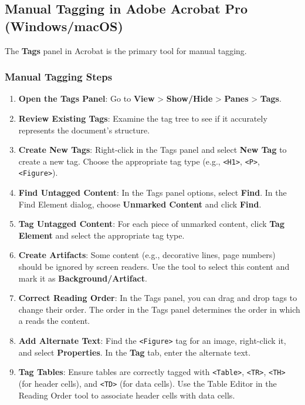 \subsection{Manual Tagging in Adobe Acrobat Pro (Windows/macOS)}
\label{subsec:manual-tagging-acrobat}
The \textbf{Tags} panel in Acrobat is the primary tool for manual tagging.

\subsubsection{Manual Tagging Steps}
\label{ssubsec:manual-tagging-steps}
\begin{enumerate}
	\item \textbf{Open the Tags Panel}: Go to \textbf{View} > \textbf{Show/Hide} > \textbf{ Panes} > \textbf{Tags}.
	\item \textbf{Review Existing Tags}: Examine the tag tree to see if it accurately represents the document's structure.
	\item \textbf{Create New Tags}: Right-click in the Tags panel and select \textbf{New Tag} to create a new tag. Choose the appropriate tag type (e.g., \texttt{<H1>}, \texttt{<P>}, \texttt{<Figure>}).
	\item \textbf{Find Untagged Content}: In the Tags panel options, select \textbf{Find}. In the Find Element dialog, choose \textbf{Unmarked Content} and click \textbf{Find}.
	\item \textbf{Tag Untagged Content}: For each piece of unmarked content, click \textbf{Tag Element} and select the appropriate tag type.
	\item \textbf{Create Artifacts}: Some content (e.g., decorative lines, page numbers) should be ignored by screen readers. Use the  tool to select this content and mark it as \textbf{Background/Artifact}.
	\item \textbf{Correct Reading Order}: In the Tags panel, you can drag and drop tags to change their order. The order in the Tags panel determines the order in which a  reads the content.
	\item \textbf{Add Alternate Text}: Find the \texttt{<Figure>} tag for an image, right-click it, and select \textbf{Properties}. In the \textbf{Tag} tab, enter the alternate text.
	\item \textbf{Tag Tables}: Ensure tables are correctly tagged with \texttt{<Table>}, \texttt{<TR>}, \texttt{<TH>} (for header cells), and \texttt{<TD>} (for data cells). Use the Table Editor in the Reading Order tool to associate header cells with data cells.
\end{enumerate}


